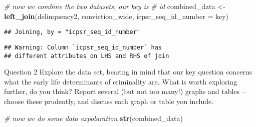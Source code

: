 \documentclass[]{tufte-handout}
\newenvironment{Shaded}{}{}
\newcommand{\KeywordTok}[1]{\textcolor[rgb]{0.00,0.44,0.13}{\textbf{#1}}}
\newcommand{\DataTypeTok}[1]{\textcolor[rgb]{0.56,0.13,0.00}{#1}}
\newcommand{\StringTok}[1]{\textcolor[rgb]{0.25,0.44,0.63}{#1}}
\newcommand{\CommentTok}[1]{\textcolor[rgb]{0.38,0.63,0.69}{\textit{#1}}}
\newcommand{\OperatorTok}[1]{\textcolor[rgb]{0.40,0.40,0.40}{#1}}
\newcommand{\NormalTok}[1]{#1}
\begin{document}
\begin{Shaded}
\end{Shaded}

\begin{Shaded}
\begin{Highlighting}[]
\CommentTok{# now we combine the two datasets, our key is}
\CommentTok{# id}
\NormalTok{combined_data <-}\StringTok{ }\KeywordTok{left_join}\NormalTok{(delinquency2, conviction_wide, }
    \DataTypeTok{icpsr_seq_id_number =}\NormalTok{ key)}
\end{Highlighting}
\end{Shaded}

\begin{verbatim}
## Joining, by = "icpsr_seq_id_number"
\end{verbatim}

\begin{verbatim}
## Warning: Column `icpsr_seq_id_number` has
## different attributes on LHS and RHS of join
\end{verbatim}

Question 2 Explore the data set, bearing in mind that our key question
concerns what the early life determinants of criminality are. What is
worth exploring further, do you think? Report several (but not too
many!) graphs and tables -- choose these prudently, and discuss each
graph or table you include.

\begin{Shaded}
\begin{Highlighting}[]
\CommentTok{# now we do some data expolaration}
\KeywordTok{str}\NormalTok{(combined_data)}
\end{Highlighting}
\end{Shaded}
\end{document}
